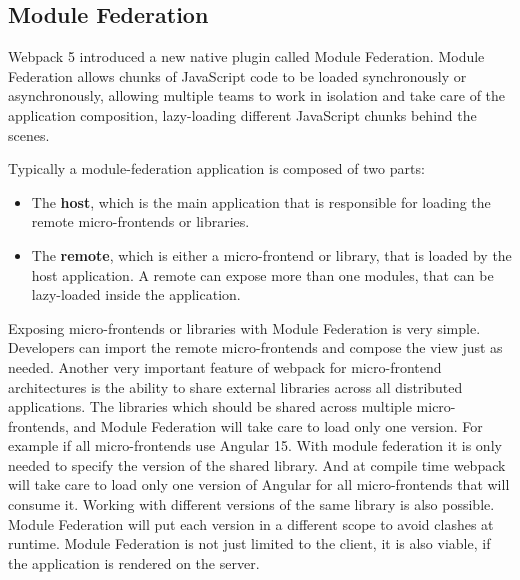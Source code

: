 \subsection{Module Federation}\label{subsection:background:micro-frontend:module-federation}

Webpack 5 introduced a new native plugin called Module Federation. Module Federation allows chunks of JavaScript code to be loaded synchronously or asynchronously, allowing multiple teams to work in isolation and take care of the application composition, lazy-loading different JavaScript chunks behind the scenes. \cite[81]{book:2021:mezzalira:applied-methods:building-micro-frontends}

\bigskip

\noindent Typically a module-federation application is composed of two parts: \cite[81]{book:2021:mezzalira:applied-methods:building-micro-frontends}

\begin{itemize}
    \item The \textbf{host}, which is the main application that is responsible for loading the remote micro-frontends or libraries.
    \item The \textbf{remote}, which is either a micro-frontend or library, that is loaded by the host application. A remote can expose more than one modules, that can be lazy-loaded inside the application.
\end{itemize}

\noindent Exposing micro-frontends or libraries with Module Federation is very simple. Developers can import the remote micro-frontends and compose the view just as needed. Another very important feature of webpack for micro-frontend architectures is the ability to share external libraries across all distributed applications. The libraries which should be shared across multiple micro-frontends, and Module Federation will take care to load only one version. For example if all micro-frontends use Angular 15. With module federation it is only needed to specify the version of the shared library. And at compile time webpack will take care to load only one version of Angular for all micro-frontends that will consume it. Working with different versions of the same library is also possible. Module Federation will put each version in a different scope to avoid clashes at runtime. Module Federation is not just limited to the client, it is also viable, if the application is rendered on the server. \cite[82-83]{book:2021:mezzalira:applied-methods:building-micro-frontends}

